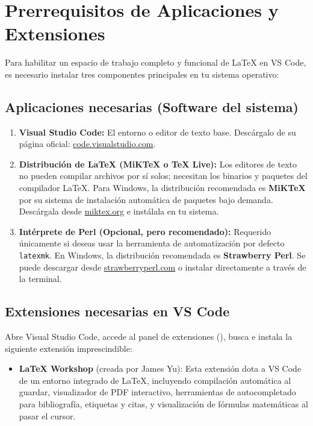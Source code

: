 \documentclass[
10pt, %
a4paper, %
oneside, %
headinclude,footinclude, %
BCOR5mm, %
]{scrartcl}
\begin{document}
\section{Prerrequisitos de Aplicaciones y Extensiones}

Para habilitar un espacio de trabajo completo y funcional de LaTeX en VS Code, es necesario instalar tres componentes principales en tu sistema operativo:

\subsection{Aplicaciones necesarias (Software del sistema)}
\begin{enumerate}
	\item \textbf{Visual Studio Code:} El entorno o editor de texto base. Descárgalo de su página oficial: \href{https://code.visualstudio.com/}{code.visualstudio.com}.
	\item \textbf{Distribución de LaTeX (MiKTeX o TeX Live):} Los editores de texto no pueden compilar archivos por sí solos; necesitan los binarios y paquetes del compilador LaTeX. Para Windows, la distribución recomendada es \textbf{MiKTeX} por su sistema de instalación automática de paquetes bajo demanda. Descárgala desde \href{https://miktex.org/}{miktex.org} e instálala en tu sistema.
	\item \textbf{Intérprete de Perl (Opcional, pero recomendado):} Requerido únicamente si deseas usar la herramienta de automatización por defecto \texttt{latexmk}. En Windows, la distribución recomendada es \textbf{Strawberry Perl}. Se puede descargar desde \href{https://strawberryperl.com/}{strawberryperl.com} o instalar directamente a través de la terminal.
\end{enumerate}

\subsection{Extensiones necesarias en VS Code}
Abre Visual Studio Code, accede al panel de extensiones (), busca e instala la siguiente extensión imprescindible:
\begin{itemize}
	\item \textbf{LaTeX Workshop} (creada por James Yu): Esta extensión dota a VS Code de un entorno integrado de LaTeX, incluyendo compilación automática al guardar, visualizador de PDF interactivo, herramientas de autocompletado para bibliografía, etiquetas y citas, y visualización de fórmulas matemáticas al pasar el cursor.
\end{itemize}
\end{document}

